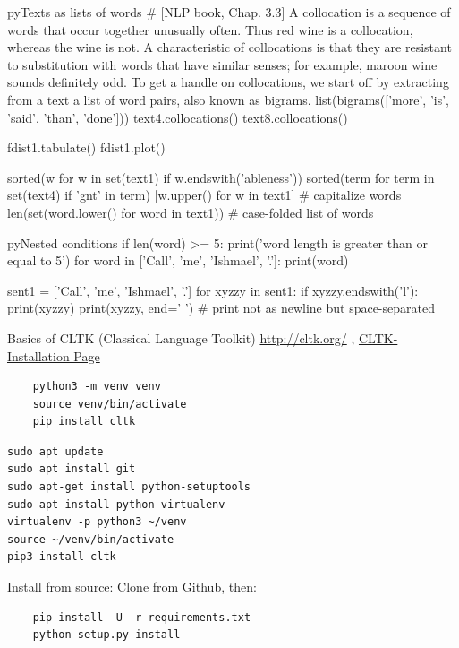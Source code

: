 \documentclass[10pt,a4paper]{article}
\begin{document}
\begin{multicols}{3}
\begin{codebox}{py}{Texts as lists of words}
# [NLP book, Chap. 3.3] A collocation is a sequence of words that occur together unusually often. Thus red wine is a collocation, whereas the wine is not. A characteristic of collocations is that they are resistant to substitution with words that have similar senses; for example, maroon wine sounds definitely odd. To get a handle on collocations, we start off by extracting from a text a list of word pairs, also known as bigrams.
list(bigrams(['more', 'is', 'said', 'than', 'done']))
text4.collocations()
text8.collocations()

fdist1.tabulate()
fdist1.plot()

sorted(w for w in set(text1) if w.endswith('ableness'))
sorted(term for term in set(text4) if 'gnt' in term)
[w.upper() for w in text1] # capitalize words
len(set(word.lower() for word in text1)) # case-folded list of words
\end{codebox}

\begin{codebox}{py}{Nested conditions}
if len(word) >= 5:
    print('word length is greater than or equal to 5')
for word in ['Call', 'me', 'Ishmael', '.']:
    print(word)

sent1 = ['Call', 'me', 'Ishmael', '.']
for xyzzy in sent1:
    if xyzzy.endswith('l'):
        print(xyzzy)
        print(xyzzy, end=' ') # print not as newline but space-separated
\end{codebox}

\begin{textbox}{Basics of CLTK (Classical Language Toolkit)}
\protect\url{http://cltk.org/} \sep
\href{http://docs.cltk.org/en/latest/installation.html}{CLTK-Installation Page}

\begin{verbatim}
    python3 -m venv venv
    source venv/bin/activate
    pip install cltk
\end{verbatim}

\begin{verbatim}
sudo apt update
sudo apt install git
sudo apt-get install python-setuptools
sudo apt install python-virtualenv
virtualenv -p python3 ~/venv
source ~/venv/bin/activate
pip3 install cltk
\end{verbatim}

Install from source: Clone from Github, then:
\begin{verbatim}
    pip install -U -r requirements.txt
    python setup.py install
\end{verbatim}


\end{textbox}
\end{multicols}
\end{document}
